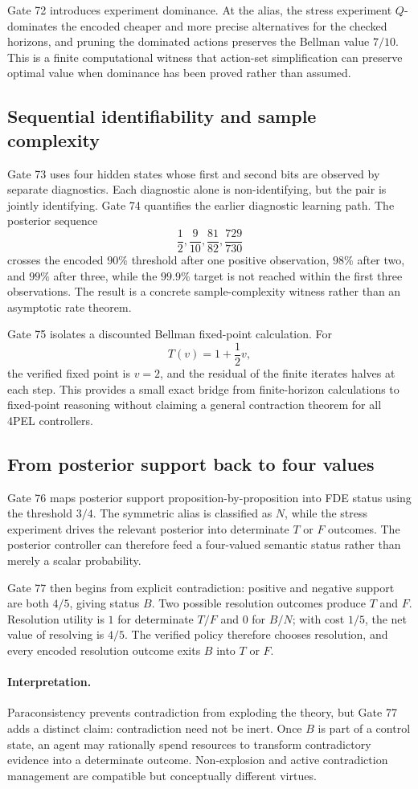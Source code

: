 Gate 72 introduces experiment dominance. At the alias, the stress experiment $Q$-dominates the encoded cheaper and more precise alternatives for the checked horizons, and pruning the dominated actions preserves the Bellman value $7/10$. This is a finite computational witness that action-set simplification can preserve optimal value when dominance has been proved rather than assumed.

\subsection{Sequential identifiability and sample complexity}

Gate 73 uses four hidden states whose first and second bits are observed by separate diagnostics. Each diagnostic alone is non-identifying, but the pair is jointly identifying. Gate 74 quantifies the earlier diagnostic learning path. The posterior sequence
\[
\frac12,\frac9{10},\frac{81}{82},\frac{729}{730}
\]
crosses the encoded $90\%$ threshold after one positive observation, $98\%$ after two, and $99\%$ after three, while the $99.9\%$ target is not reached within the first three observations. The result is a concrete sample-complexity witness rather than an asymptotic rate theorem.

Gate 75 isolates a discounted Bellman fixed-point calculation. For
\[
T(v)=1+\frac12 v,
\]
the verified fixed point is $v=2$, and the residual of the finite iterates halves at each step. This provides a small exact bridge from finite-horizon calculations to fixed-point reasoning without claiming a general contraction theorem for all 4PEL controllers.

\subsection{From posterior support back to four values}

Gate 76 maps posterior support proposition-by-proposition into FDE status using the threshold $3/4$. The symmetric alias is classified as $N$, while the stress experiment drives the relevant posterior into determinate $T$ or $F$ outcomes. The posterior controller can therefore feed a four-valued semantic status rather than merely a scalar probability.

Gate 77 then begins from explicit contradiction: positive and negative support are both $4/5$, giving status $B$. Two possible resolution outcomes produce $T$ and $F$. Resolution utility is $1$ for determinate $T/F$ and $0$ for $B/N$; with cost $1/5$, the net value of resolving is $4/5$. The verified policy therefore chooses resolution, and every encoded resolution outcome exits $B$ into $T$ or $F$.

\paragraph{Interpretation.}
Paraconsistency prevents contradiction from exploding the theory, but Gate 77 adds a distinct claim: contradiction need not be inert. Once $B$ is part of a control state, an agent may rationally spend resources to transform contradictory evidence into a determinate outcome. Non-explosion and active contradiction management are compatible but conceptually different virtues.

